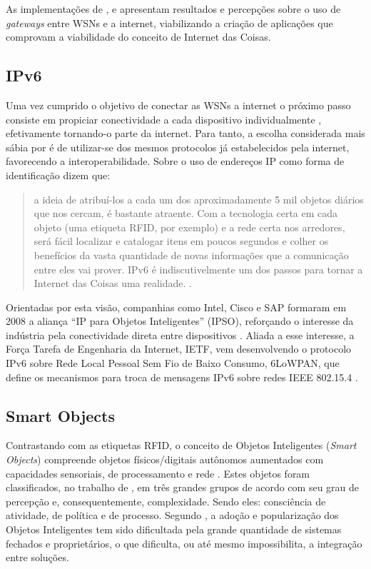 \documentclass[twoside,english,brazilian]{UNISINOSmonografia}
\begin{document}
	As implementações de ,  e 
	 apresentam resultados e percepções sobre o uso de 
	\textit{gateways} entre WSNs e a internet, viabilizando a criação de 
	aplicações que comprovam a viabilidade do conceito de Internet das Coisas.

\subsection{IPv6}
	Uma vez cumprido o objetivo de conectar as WSNs a internet o próximo passo 
	consiste em propiciar conectividade a cada dispositivo individualmente 
	\cite[p.~13]{Atzori2010b}, efetivamente tornando-o parte da internet.
	Para tanto, a escolha considerada mais sábia por  
	é de utilizar-se dos mesmos protocolos já estabelecidos pela internet, 
	favorecendo a interoperabilidade.
	Sobre o uso de endereços IP como forma de 
	identificação  dizem que:
	\begin{quote}
		a ideia de atribuí-los a cada um dos aproximadamente 5 
		mil objetos diários que nos cercam, é bastante atraente.
		Com a tecnologia certa em cada objeto (uma etiqueta RFID, por exemplo) 
		e a rede certa nos arredores, será fácil localizar e catalogar itens 
		em poucos segundos e colher os benefícios da vasta quantidade de novas 
		informações que a comunicação entre eles vai prover. IPv6 é 
		indiscutivelmente um dos passos para tornar a Internet das Coisas uma 
		realidade.
		\cite[p.~15]{Sundmaeker2010}.
	\end{quote}
	
	Orientadas por esta visão, companhias como Intel, Cisco e SAP formaram em 
	2008 a aliança ``IP para Objetos Inteligentes'' (IPSO), reforçando o 
	interesse da indústria pela conectividade direta entre dispositivos 
	\cite{Dunkels2008, Mattern2010a}. 
	Aliada a esse interesse, a Força Tarefa de Engenharia da Internet, IETF, 
	vem desenvolvendo o protocolo IPv6 sobre Rede Local Pessoal Sem Fio de 
	Baixo Consumo, 6LoWPAN, que define os mecanismos para troca de mensagens 
	IPv6 sobre redes IEEE 802.15.4 \cite{Gomez2010}.

\subsection{Smart Objects}
	Contrastando com as etiquetas RFID, o conceito de Objetos Inteligentes 
	(\textit{Smart Objects}) compreende objetos físicos/digitais autônomos 
	aumentados com capacidades sensoriais, de processamento e rede 
	\cite{Gellersen2001}.
	Estes objetos foram classificados, no trabalho de , em 
	três grandes grupos de acordo com seu grau de percepção e, 
	consequentemente, complexidade. Sendo eles: consciência de atividade, de 
	política e de processo.
	Segundo , a adoção e popularização dos Objetos 
	Inteligentes tem sido dificultada pela grande quantidade de sistemas 
	fechados e proprietários, o que dificulta, ou até mesmo impossibilita, a 
	integração entre soluções. 
	
\end{document}
